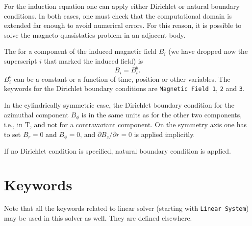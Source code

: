 \begin{versiona}
For the induction equation one can apply either Dirichlet or natural boundary
conditions. In both cases, one must check that the computational domain is
extended far enough to avoid numerical errors. For this reason, it is possible
to solve the magneto-quasistatics problem in an adjacent body.

The  for a component of the induced
magnetic field $B_i$ (we have dropped now the superscript $i$ that marked
the induced field) is
\begin{equation}
B_i = B_i^b. 
\end{equation}
$B_i^b$ can be a constant or a function of time, position or other 
variables. The keywords for the Dirichlet boundary conditions are
{\tt Magnetic Field 1}, {\tt 2} and {\tt 3}.

In the cylindrically symmetric case, the Dirichlet boundary
condition for the azimuthal component $B_\phi$ is in the same units as for
the other two components, i.e., in T, and not for a contravariant component.
On the symmetry axis one has to set $B_r = 0$ and $B_\phi = 0$, and
$\partial B_z/\partial r = 0$  is applied implicitly.

If no Dirichlet condition is specified, natural boundary condition is applied.

\section{Keywords} 
\end{versiona}

\sifbegin
{} 
Note that all the keywords related to linear solver (starting with {\tt Linear System}) may be used in this solver as well.
They are defined elsewhere. 

